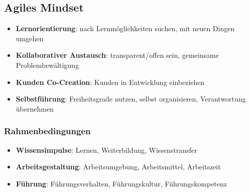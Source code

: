 \documentclass{article}
\begin{document}
\subsection{Agiles Mindset}

\begin{itemize}
  \item \textbf{Lernorientierung}: nach Lernmöglichkeiten suchen, mit neuen Dingen umgehen
  \item \textbf{Kollaborativer Austausch}: transparent/offen sein, gemeinsame Problembewältigung
  \item \textbf{Kunden Co-Creation}: Kunden in Entwicklung einbeziehen
  \item \textbf{Selbstführung}: Freiheitsgrade nutzen, selbst organisieren, Verantwortung übernehmen
\end{itemize}

\subsubsection{Rahmenbedingungen}

\begin{itemize}
  \item \textbf{Wissensimpulse}: Lernen, Weiterbildung, Wissenstransfer
  \item \textbf{Arbeitsgestaltung}: Arbeitsumgebung, Arbeitsmittel, Arbeitszeit
  \item \textbf{Führung}: Führungsverhalten, Führungskultur, Führungskompetenz
\end{itemize}
\end{document}
